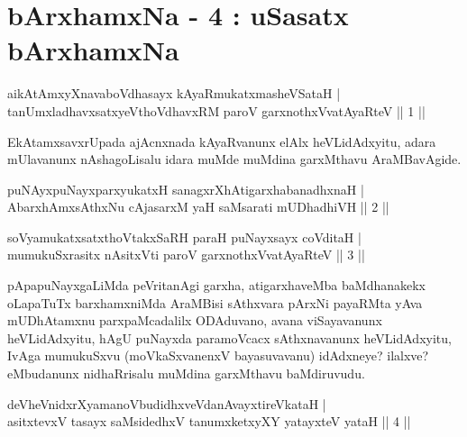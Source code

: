
\chapter{bArxhamxNa - 4 : uSasatx bArxhamxNa}

\begin{shl}
aikAtAmxyXnavaboVdhasayx kAyaRmukatxmasheVSataH |\\
tanUmxladhavxsatxyeV\s thoVdhavxRM paroV garxnothxV\s vatAyaRteV \hfill || 1 ||
\end{shl}

\begin{artha}
EkAtamxsavxrUpada ajAcnxnada kAyaRvanunx elAlx heVLidAdxyitu, adara mUlavanunx nAshagoLisalu idara muMde muMdina garxMthavu AraMBavAgide.
\end{artha}

\begin{shl}
puNAyxpuNayxparxyukatxH sanagxrXhAtigarxhabanadhxnaH |\\
AbarxhAmx\s \s sAthxNu cAjasarxM yaH saMsarati mUDhadhiVH \hfill || 2 ||
\end{shl}

\begin{shl}
soV\s yamukatxsatxthoVtakxSaRH paraH puNayxsayx coVditaH |\\
mumukuSxrasitx nAsitxVti paroV garxnothxV\s vatAyaRteV \hfill || 3 ||
\end{shl}

\begin{artha}
pApapuNayxgaLiMda peVritanAgi garxha, atigarxhaveMba baMdhanakekx oLapaTuTx barxhamxniMda AraMBisi sAthxvara pArxNi payaRMta yAva mUDhAtamxnu parxpaMcadalilx ODAduvano, avana viSayavanunx heVLidAdxyitu, hAgU puNayxda paramoVcacx sAthxnavanunx heVLidAdxyitu, IvAga mumukuSxvu (moVkaSxvanenxV bayasuvavanu) idAdxneye? ilalxve? eMbudanunx nidhaRrisalu muMdina garxMthavu baMdiruvudu.
\end{artha}


\begin{shl}
deVheVnidxrXyamanoVbudidhxveVdanAvayxtireVkataH |\\
asitxtevxV tasayx saMsidedhxV tanumxketxyXY yatayxteV yataH \hfill || 4 ||
\end{shl}

